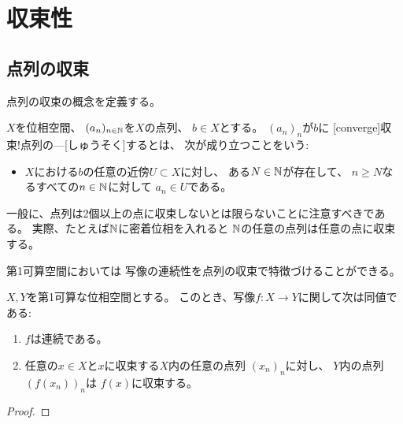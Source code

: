 \documentclass[report]{jlreq}
\begin{document}
%
\chapter{収束性}

%
\section{点列の収束}

点列の収束の概念を定義する。

\begin{definition}[点列の収束]
    $X$を位相空間、
    $(a_n)_{n \in \mathbb{N}}$を$X$の点列、
    $b \in X$とする。
    $(a_n)_n$が$b$に
    [converge]{収束!点列の---}[しゅうそく]するとは、
    次が成り立つことをいう:
    \begin{itemize}
        \item $X$における$b$の任意の近傍$U \subset X$に対し、
            ある$N \in \mathbb{N}$が存在して、
            $n \ge N$なるすべての$n \in \mathbb{N}$に対して
            $a_n \in U$である。
    \end{itemize}
\end{definition}

\begin{remark}
    一般に、点列は2個以上の点に収束しないとは限らないことに注意すべきである。
    実際、たとえば$\mathbb{N}$に密着位相を入れると
    $\mathbb{N}$の任意の点列は任意の点に収束する。
\end{remark}

第1可算空間においては
写像の連続性を点列の収束で特徴づけることができる。

\begin{proposition}[連続写像の特徴付け]
    $X, Y$を第1可算な位相空間とする。
    このとき、写像$f \colon X \to Y$に関して次は同値である:
    \begin{enumerate}
        \item $f$は連続である。
        \item 任意の$x \in X$と$x$に収束する$X$内の任意の点列
            $(x_n)_n$に対し、
            $Y$内の点列$(f(x_n))_n$は
            $f(x)$に収束する。
    \end{enumerate}
\end{proposition}

\begin{proof}
    \TODO{}
\end{proof}
\end{document}
